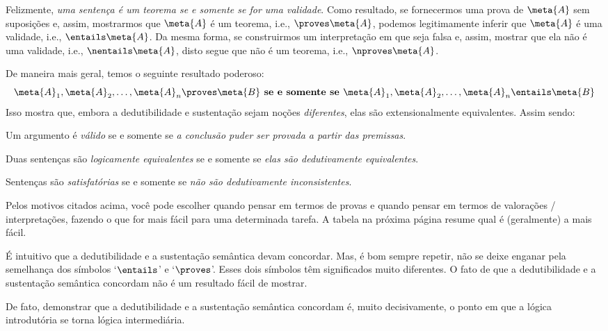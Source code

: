 Felizmente, \emph{uma senten\c ca \'e um teorema se e somente se for uma validade}. Como resultado, se fornecermos uma prova de $\meta{A}$ sem suposi\c c\~oes e, assim, mostrarmos que $\meta{A}$ \'e um teorema, i.e., ${}\proves \meta{A}$, podemos legitimamente inferir que $\meta{A}$ é uma validade, i.e., $\entails\meta{A}$. Da mesma forma, se construirmos um interpreta\c c\~ao em que  seja falsa e, assim, mostrar que ela n\~ao \'e uma validade, i.e., $\nentails \meta{A}$, disto  segue que  n\~ao \'e um teorema, i.e.,  $\nproves \meta{A}$.

De maneira mais geral, temos o seguinte resultado poderoso:
$$\meta{A}_1, \meta{A}_2, \ldots, \meta{A}_n \proves\meta{B} \textbf{ se e somente se }\meta{A}_1, \meta{A}_2, \ldots, \meta{A}_n \entails\meta{B}$$
Isso mostra que, embora a dedutibilidade e sustenta\c c\~ao sejam no\c c\~oes \emph{diferentes}, elas s\~ao extensionalmente equivalentes. Assim sendo:
	\begin{ebullet}
		\item Um argumento \'e \emph{v\'alido} se e somente se \emph{a conclus\~ao puder ser provada a partir das premissas}.
		\item Duas senten\c cas s\~ao \emph{logicamente equivalentes} se e somente se \emph{elas s\~ao dedutivamente equivalentes}.
		\item Senten\c cas s\~ao \emph{satisfat\'orias} se e somente se  \emph{n\~ao s\~ao dedutivamente inconsistentes}.
	\end{ebullet}
 
Pelos  motivos citados acima, voc\^e pode escolher quando pensar em termos de provas e quando pensar em termos de valora\c c\~oes / interpreta\c c\~oes, fazendo o que for mais f\'acil para uma determinada tarefa. A tabela na pr\'oxima p\'agina resume qual \'e (geralmente) a mais f\'acil.

\'E intuitivo que a dedutibilidade e a sustenta\c c\~ao sem\^antica devam concordar. Mas, \'e bom sempre repetir, n\~ao se deixe enganar pela semelhan\c ca dos s\'imbolos `$\entails$' e `$\proves$'. Esses dois s\'imbolos t\^em significados muito diferentes. O fato de que a dedutibilidade  e a sustenta\c c\~ao sem\^antica concordam n\~ao \'e um resultado f\'acil de mostrar. 

De fato, demonstrar que a dedutibilidade e a sustenta\c c\~ao sem\^antica concordam \'e, muito decisivamente, o ponto em que a l\'ogica introdut\'oria se torna l\'ogica intermedi\'aria.


